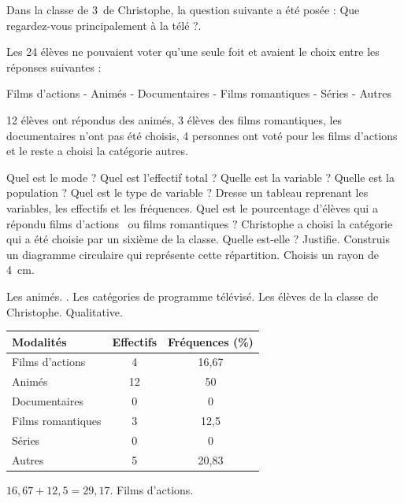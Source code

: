 \documentclass[a4paper,fontsize=12pt, parskip=half]{scrartcl}
\begin{document}
\pagebreak


\begin{exercise}
    Dans la classe de 3\ieme\ de Christophe, la question suivante a été posée :
    \og Que regardez-vous principalement à la télé ?\fg.

    Les 24 élèves ne pouvaient voter qu'une seule foit et avaient le choix
    entre les réponses suivantes :
    \begin{center}
        Films d'actions - Animés - Documentaires - Films romantiques - Séries
        - Autres
    \end{center}
    12 élèves ont répondus des animés, 3 élèves des films romantiques, les
    documentaires n'ont pas été choisis, 4 personnes ont voté pour les films
    d'actions et le reste a choisi la catégorie autres.
    \begin{tasks}
        \task Quel est le mode ?
        \task Quel est l’effectif total ?
        \task Quelle est la variable ?
        \task Quelle est la population ?
        \task Quel est le type de variable ?
        \task Dresse un tableau reprenant les variables, les effectifs et
        les fréquences.
        \task Quel est le pourcentage d’élèves qui a répondu \og films
        d’actions \fg\ ou \og films romantiques \fg ?
        \task Christophe a choisi la catégorie qui a été choisie par un sixième
        de la classe. Quelle est-elle ? Justifie.
        \task Construis un diagramme circulaire qui représente cette répartition. Choisis un rayon de \SI{4}{cm}.
    \end{tasks}
\end{exercise}
\begin{solution}
    \begin{tasks}
        \task Les animés.
        .
        \task Les catégories de programme télévisé.
        \task Les élèves de la classe de Christophe.
        \task Qualitative.
        \task
        \begin{tabular}[t]{lcc}
            \toprule
            Modalités         & Effectifs & Fréquences (\%) \\
            \midrule
            Films d'actions   & 4         & 16,67           \\
            Animés            & 12        & 50              \\
            Documentaires     & 0         & 0               \\
            Films romantiques & 3         & 12,5            \\
            Séries            & 0         & 0               \\
            Autres            & 5         & 20,83           \\
            \bottomrule
        \end{tabular}
        \task $16,67 + 12,5 = 29,17$.
        \task Films d'actions.
        \task %
    \end{tasks}
\end{solution}
\end{document}
